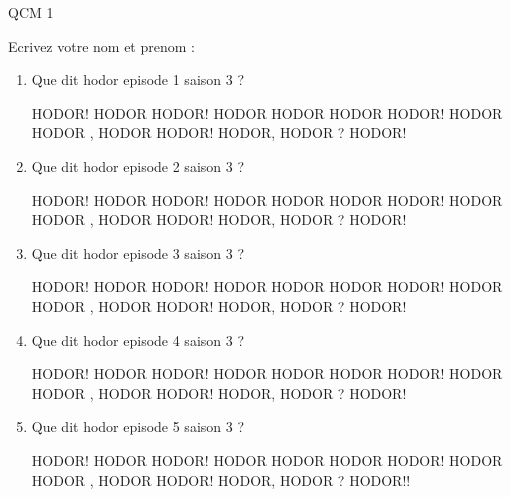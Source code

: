 \documentclass[a4paper, 11pt]{article}
\begin{document}
	\newenvironment{qcm} {} {}	
	QCM 1
	
	Ecrivez votre nom et prenom :
	\begin{qcm}
		\begin{enumerate}
			\item Que dit hodor episode 1 saison 3 ?
			\begin{tabenum} [1)]
				\tabenumitem HODOR!
				\tabenumitem HODOR HODOR!
				\tabenumitem HODOR HODOR HODOR HODOR!
				\tabenumitem HODOR HODOR , HODOR HODOR!
				\tabenumitem HODOR, HODOR ? HODOR!
			\end{tabenum}
		\vspace{5mm}

			\item Que dit hodor episode 2 saison 3 ?
			\begin{tabenum} [1)]
				\tabenumitem HODOR!
				\tabenumitem HODOR HODOR!
				\tabenumitem HODOR HODOR HODOR HODOR!
				\tabenumitem HODOR HODOR , HODOR HODOR!
				\tabenumitem HODOR, HODOR ? HODOR!
			\end{tabenum}
		\vspace{5mm}

			\item Que dit hodor episode 3 saison 3 ?
			\begin{tabenum} [1)]
				\tabenumitem HODOR!
				\tabenumitem HODOR HODOR!
				\tabenumitem HODOR HODOR HODOR HODOR!
				\tabenumitem HODOR HODOR , HODOR HODOR!
				\tabenumitem HODOR, HODOR ? HODOR!
			\end{tabenum}
		\vspace{5mm}

			\item Que dit hodor episode 4 saison 3 ?
			\begin{tabenum} [1)]
				\tabenumitem HODOR!
				\tabenumitem HODOR HODOR!
				\tabenumitem HODOR HODOR HODOR HODOR!
				\tabenumitem HODOR HODOR , HODOR HODOR!
				\tabenumitem HODOR, HODOR ? HODOR!
			\end{tabenum}
		\vspace{5mm}

			\item Que dit hodor episode 5 saison 3 ?
			\begin{tabenum} [1)]
				\tabenumitem HODOR!
				\tabenumitem HODOR HODOR!
				\tabenumitem HODOR HODOR HODOR HODOR!
				\tabenumitem HODOR HODOR , HODOR HODOR!
				\tabenumitem HODOR, HODOR ? HODOR!!
			\end{tabenum}
		\vspace{5mm}


\end{enumerate}
\end{qcm}
\end{document}
